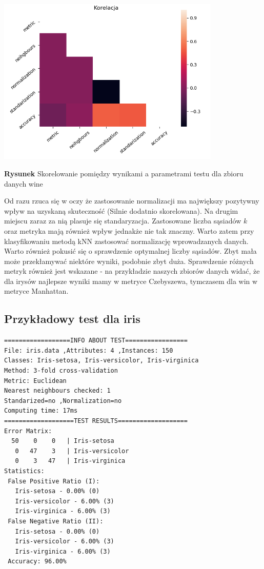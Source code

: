 \documentclass{classrep}
\begin{document}
\begin{center}
	\includegraphics[height=8cm]{korelacja.png}
	
	\textbf{Rysunek} Skorelowanie pomiędzy wynikami a parametrami testu dla zbioru danych wine
\end{center}

Od razu rzuca się w oczy że zastosowanie normalizacji ma największy pozytywny wpływ na uzyskaną skuteczność (Silnie dodatnio skorelowana). Na drugim miejscu zaraz za nią plasuje się standaryzacja. Zastosowane liczba sąsiadów $k$ oraz metryka mają również wpływ jednakże nie tak znaczny. Warto zatem przy klasyfikowaniu metodą kNN zastosować normalizację wprowadzanych danych. Warto również pokusić się o sprawdzenie optymalnej liczby sąsiadów. Zbyt mała może przekłamywać niektóre wyniki, podobnie zbyt duża. Sprawdzenie różnych metryk również jest wskazane - na przykładzie naszych zbiorów danych widać, że dla irysów najlepsze wyniki mamy w metryce Czebyszewa, tymczasem dla win w metryce Manhattan.

\subsection{Przykładowy test dla iris}
\begin{verbatim}
==================INFO ABOUT TEST=================
File: iris.data ,Attributes: 4 ,Instances: 150
Classes: Iris-setosa, Iris-versicolor, Iris-virginica
Method: 3-fold cross-validation
Metric: Euclidean
Nearest neighbours checked: 1
Standarized=no ,Normalization=no
Computing time: 17ms
===================TEST RESULTS===================
Error Matrix:
  50    0    0   | Iris-setosa
   0   47    3   | Iris-versicolor
   0    3   47   | Iris-virginica
Statistics:
 False Positive Ratio (I):
   Iris-setosa - 0.00% (0)
   Iris-versicolor - 6.00% (3)
   Iris-virginica - 6.00% (3)
 False Negative Ratio (II):
   Iris-setosa - 0.00% (0)
   Iris-versicolor - 6.00% (3)
   Iris-virginica - 6.00% (3)
 Accuracy: 96.00%
\end{verbatim}
\end{document}

